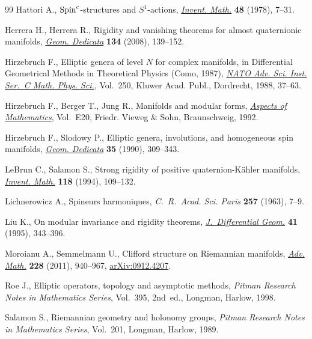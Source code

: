\begin{thebibliography}{99}
Hattori A., {${\rm Spin}^{c}$}-structures and {$S^{1}$}-actions,
 \href{https://doi.org/10.1007/BF01390060}{\textit{Invent. Math.}} \textbf{48} (1978), 7--31.

Herrera H., Herrera R., Rigidity and vanishing theorems for almost quaternionic
 manifolds, \href{https://doi.org/10.1007/s10711-008-9250-4}{\textit{Geom. Dedicata}} \textbf{134} (2008), 139--152.

Hirzebruch F., Elliptic genera of level {$N$} for complex manifolds, in
 Dif\/ferential Geometrical Methods in Theoretical Physics ({C}omo, 1987),
 \href{https://doi.org/10.1007/978-94-015-7809-7_3}{\textit{NATO Adv. Sci. Inst. Ser.~C Math. Phys. Sci.}}, Vol.~250, Kluwer Acad.
 Publ., Dordrecht, 1988, 37--63.

Hirzebruch F., Berger T., Jung R., Manifolds and modular forms, \href{https://doi.org/10.1007/978-3-663-14045-0}{\textit{Aspects
 of Mathematics}}, Vol.~E20, Friedr. Vieweg \& Sohn, Braunschweig, 1992.

Hirzebruch F., Slodowy P., Elliptic genera, involutions, and homogeneous spin
 manifolds, \href{https://doi.org/10.1007/BF00147351}{\textit{Geom. Dedicata}} \textbf{35} (1990), 309--343.

LeBrun C., Salamon S., Strong rigidity of positive quaternion-{K}\"ahler
 manifolds, \href{https://doi.org/10.1007/BF01231528}{\textit{Invent. Math.}} \textbf{118} (1994), 109--132.

Lichnerowicz A., Spineurs harmoniques, \textit{C.~R.~Acad. Sci. Paris}
 \textbf{257} (1963), 7--9.

Liu K., On modular invariance and rigidity theorems, \href{https://doi.org/10.4310/jdg/1214456221}{\textit{J.~Differential
 Geom.}} \textbf{41} (1995), 343--396.

Moroianu A., Semmelmann U., Clif\/ford structure on {R}iemannian manifolds,
 \href{https://doi.org/10.1016/j.aim.2011.06.006}{\textit{Adv. Math.}} \textbf{228} (2011), 940--967, \href{http://arxiv.org/abs/0912.4207}{arXiv:0912.4207}.

Roe J., Elliptic operators, topology and asymptotic methods, \textit{Pitman
 Research Notes in Mathematics Series}, Vol.~395, 2nd~ed., Longman, Harlow,
 1998.

Salamon S., Riemannian geometry and holonomy groups, \textit{Pitman Research
 Notes in Mathematics Series}, Vol.~201, Longman, Harlow, 1989.


\end{thebibliography}
